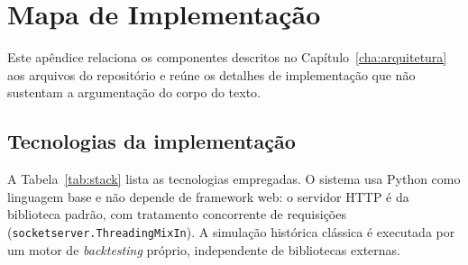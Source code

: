 
\chapter{Mapa de Implementação}
\label{ap:mapa}

Este apêndice relaciona os componentes descritos no Capítulo~\ref{cha:arquitetura} aos arquivos do repositório e reúne os detalhes de implementação que não sustentam a argumentação do corpo do texto.

\section{Tecnologias da implementação}

A Tabela~\ref{tab:stack} lista as tecnologias empregadas. O sistema usa Python como linguagem base e não depende de framework web: o servidor HTTP é da biblioteca padrão, com tratamento concorrente de requisições (\texttt{socketserver.ThreadingMixIn}). A simulação histórica clássica é executada por um motor de \textit{backtesting} próprio, independente de bibliotecas externas.

